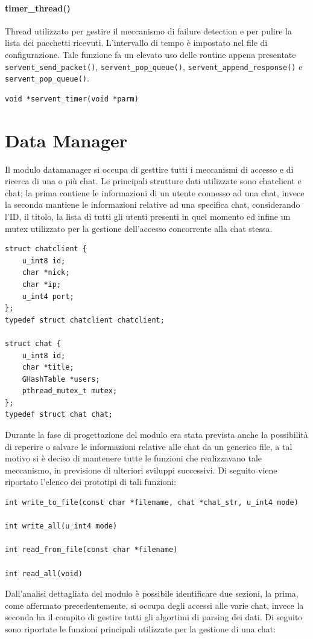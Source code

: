 \paragraph{timer\_thread()}
Thread utilizzato per gestire il meccanismo di failure detection e per pulire la lista dei pacchetti ricevuti. L'intervallo di tempo è impostato nel file di configurazione. Tale funzione fa un elevato uso delle routine appena presentate \texttt{servent\_send\_packet()}, \texttt{servent\_pop\_queue()}, \texttt{servent\_append\_response()} e \texttt{servent\_pop\_queue()}.
\begin{lstlisting}[frame=trBL]
void *servent_timer(void *parm)
\end{lstlisting}

\section{Data Manager}
Il modulo datamanager si occupa di gesttire tutti i meccanismi di accesso e di ricerca di una o più chat. Le principali strutture dati utilizzate sono chatclient e chat; la prima contiene le informazioni di un utente connesso ad una chat, invece la seconda mantiene le informazioni relative ad una specifica chat, considerando l'ID, il titolo, la lista di tutti gli utenti presenti in quel momento ed infine un mutex utilizzato per la gestione dell'accesso concorrente alla chat stessa. 
\begin{lstlisting}
struct chatclient {
	u_int8 id;
	char *nick;
	char *ip;
	u_int4 port;
};
typedef struct chatclient chatclient;

struct chat {
	u_int8 id;
	char *title;
	GHashTable *users;
	pthread_mutex_t mutex;
};
typedef struct chat chat;
\end{lstlisting}
Durante la fase di progettazione del modulo era stata prevista anche la possibilità di reperire o salvare le informazioni relative alle chat da un generico file, a tal motivo si è deciso di mantenere tutte le funzioni che realizzavano tale meccanismo, in previsione  di ulteriori sviluppi successivi. Di seguito viene riportato l'elenco dei prototipi di tali funzioni:
\begin{lstlisting}
int write_to_file(const char *filename, chat *chat_str, u_int4 mode)

int write_all(u_int4 mode)

int read_from_file(const char *filename)

int read_all(void)
\end{lstlisting}  
Dall'analisi dettagliata del modulo è possibile identificare due sezioni, la prima, come affermato precedentemente, si occupa degli accessi alle varie chat, invece la seconda ha il compito di gestire tutti gli algortimi di parsing dei dati. Di seguito sono riportate le funzioni principali utilizzate per la gestione di una chat:
